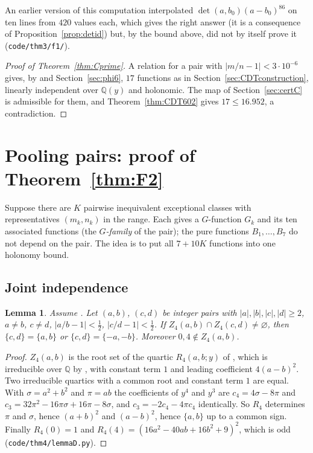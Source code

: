 \documentclass[11pt]{amsart}
\newtheorem{lemma}[proposition]{Lemma}
\theoremstyle{definition}
\theoremstyle{remark}
\numberwithin{equation}{section}
\newcommand{\QQ}{\mathbb{Q}}
\newcommand{\file}[1]{{\def\_{\textunderscore\allowbreak}\texttt{#1}}}
\begin{document}
An earlier version of this computation interpolated $\det(a,b_0)(a-b_0)^{86}$ on ten lines from $420$ values each, which
gives the right answer (it is a consequence of Proposition~\ref{prop:detid}) but, by the bound above, did not by itself
prove it (\file{code/thm3/f1/}).

\begin{proof}[Proof of Theorem~\ref{thm:Cprime}]
A relation for a pair with $|m/n-1|<3\cdot10^{-6}$ gives, by \cite[Prop.~14.1.11, Lemma~14.3.1]{CDT} and
Section~\ref{sec:phi6}, $17$ functions as in Section~\ref{sec:CDTconstruction}, linearly independent over $\QQ(y)$ and
holonomic. The map of Section~\ref{sec:certC} is admissible for them, and Theorem~\ref{thm:CDT602} gives
$17\le16.952$, a contradiction.
\end{proof}

\section{Pooling pairs: proof of Theorem~\ref{thm:F2}}\label{sec:F2}

Suppose there are $K$ pairwise inequivalent exceptional classes with representatives $(m_k,n_k)$ in the range. Each gives
a $G$-function $G_k$ and its ten associated functions (the \emph{$G$-family} of the pair); the pure functions
$B_1,\dots,B_7$ do not depend on the pair. The idea is to put all $7+10K$ functions into one holonomy bound.

\subsection{Joint independence}

\begin{lemma}\label{lem:D}
Assume \cite[Lemma~14.2.4]{CDT}. Let $(a,b)$, $(c,d)$ be integer pairs with $|a|,|b|,|c|,|d|\ge2$, $a\ne b$, $c\ne d$,
$|a/b-1|<\frac12$, $|c/d-1|<\frac12$. If $Z_4(a,b)\cap Z_4(c,d)\ne\varnothing$, then $\{c,d\}=\{a,b\}$ or
$\{c,d\}=\{-a,-b\}$. Moreover $0,4\notin Z_4(a,b)$.
\end{lemma}

\begin{proof}
$Z_4(a,b)$ is the root set of the quartic $R_4(a,b;y)$ of \cite[(14.2.1)]{CDT}, which is irreducible over $\QQ$ by
\cite[Lemma~14.2.4]{CDT}, with constant term $1$ and leading coefficient $4(a-b)^2$. Two irreducible quartics with a
common root and constant term $1$ are equal. With $\sigma=a^2+b^2$ and $\pi=ab$ the coefficients of $y^4$ and $y^3$ are
$c_4=4\sigma-8\pi$ and $c_3=32\pi^2-16\pi\sigma+16\pi-8\sigma$, and $c_3=-2c_4-4\pi c_4$ identically. So $R_4$ determines
$\pi$ and $\sigma$, hence $(a+b)^2$ and $(a-b)^2$, hence $\{a,b\}$ up to a common sign. Finally $R_4(0)=1$ and
$R_4(4)=(16a^2-40ab+16b^2+9)^2$, which is odd (\file{code/thm4/lemmaD.py}).
\end{proof}
\end{document}
